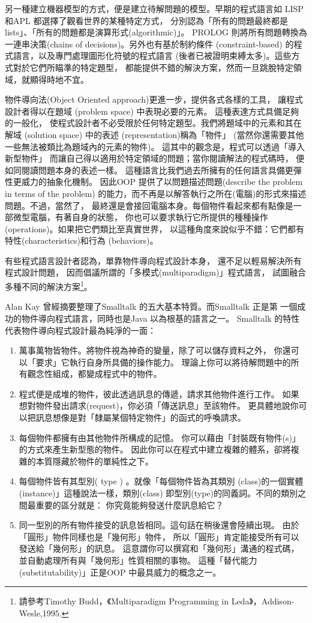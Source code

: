 另一種建立機器模型的方式，便是建立待解問題的模型。早期的程式語言如
LISP 和APL 都選擇了觀看世界的某種特定方式，
分別認為「所有的問題最終都是lists」、「所有的問題都是演算形式(algorithmic)」。
PROLOG 則將所有問題轉換為一連串決策(chains of decisions)。另外也有基於制約條件
(constraint-based) 的程式語言，以及專門處理圖形化符號的程式語言
(後者已被證明束縛太多)。這些方式對於它們所瞄準的特定題型，
都能提供不錯的解決方案，然而一旦跳脫特定領域，就顯得時地不宜。

物件導向法(Object Oriented approach)更進一步，提供各式各樣的工具，
讓程式設計者得以在題域 (problem space) 中表現必要的元素。
這種表達方式具備足夠的一般化，
使程式設計者不必受限於任何特定題型。我們將題域中的元素和其在解域
(solution space) 中的表述 (representation)稱為「物件」
(當然你還需要其他一些無法被類比為題域內的元素的物件)。
這其中的觀念是，程式可以透過「導入新型物件」
而讓自己得以適用於特定領域的問題；當你閱讀解法的程式碼時，
便如同閱讀問題本身的表述一樣。
這種語言比我們過去所擁有的任何語言具備更彈性更威力的抽象化機制。
因此OOP 提供了以問題描述問題(describe the problem in terms of the problem)
的能力，而不再是以解答執行之所在(電腦)的形式來描述問題。不過，當然了，
最終還是會接回電腦本身。每個物件看起來都有點像是一部微型電腦，有著自身的狀態，
你也可以要求執行它所提供的種種操作(operations)。如果把它們類比至真實世界，
以這種角度來說似乎不錯：它們都有特性(characteristics)和行為 (behaviors)。

有些程式語言設計者認為，單靠物件導向程式設計本身，
還不足以輕易解決所有程式設計問題，
因而倡議所謂的「多模式(multiparadigm)」程式語言，
試圖融合多種不同的解決方案\footnote{請參考Timothy Budd，《Multiparadigm
Programming in Leda》，Addison-Wesle,1995.}。

Alan Kay 曾經摘要整理了Smalltalk 的五大基本特質。而Smalltalk 正是第
一個成功的物件導向程式語言，同時也是Java 以為根基的語言之一。
Smalltalk 的特性代表物件導向程式設計最為純淨的一面：
\begin{enumerate}
\item 萬事萬物皆物件。將物件視為神奇的變量，除了可以儲存資料之外，
你還可以「要求」它執行自身所具備的操作能力。
理論上你可以將待解問題中的所有觀念性組成，都變成程式中的物件。
\item 程式便是成堆的物件，彼此透過訊息的傳遞，請求其他物件進行工作。
如果想對物件發出請求(request)，你必須「傳送訊息」至該物件。
更具體地說你可以把訊息想像是對「隸屬某個特定物件」的函式的呼喚請求。
\item
每個物件都擁有由其他物件所構成的記憶。
你可以藉由「封裝既有物件(s)」的方式來產生新型態的物件。
因此你可以在程式中建立複雜的體系，卻將複雜的本質隱藏於物件的單純性之下。
\item 每個物件皆有其型別( type ) 。就像「每個物件皆為其類別
(class)的一個實體(instance)」這種說法一樣，類別(class)
即型別(type)的同義詞。不同的類別之間最重要的區分就是：
你究竟能夠發送什麼訊息給它？
\item 同一型別的所有物件接受的訊息皆相同。這句話在稍後還會陸續出現。
由於「圓形」物件同樣也是「幾何形」物件，
所以「圓形」肯定能接受所有可以發送給「幾何形」的訊息。
這意謂你可以撰寫和「幾何形」溝通的程式碼，
並自動處理所有與「幾何形」性質相關的事物。
這種「替代能力(substitutability)」正是OOP 中最具威力的概念之一。
\end{enumerate}

